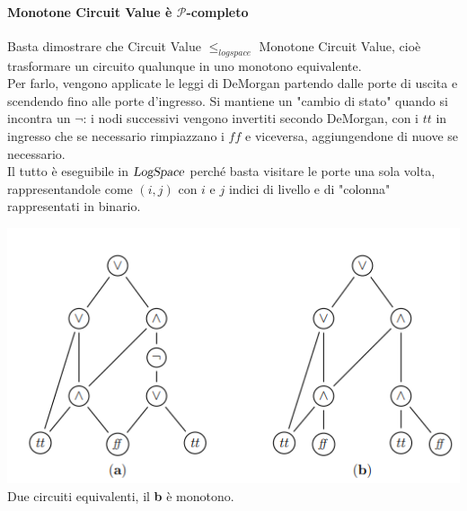 \documentclass[10pt]{book}
\begin{document}
\paragraph{Monotone Circuit Value è $\mathscr{P}$-completo} Basta dimostrare che Circuit Value $\leq_{logspace}$ Monotone Circuit Value, cioè trasformare un circuito qualunque in uno monotono equivalente.\\
Per farlo, vengono applicate le leggi di DeMorgan partendo dalle porte di uscita e scendendo fino alle porte d'ingresso. Si mantiene un "cambio di stato" quando si incontra un $\neg$: i nodi successivi vengono invertiti secondo DeMorgan, con i $tt$ in ingresso che se necessario rimpiazzano i $ff$ e viceversa, aggiungendone di nuove se necessario.\\
Il tutto è eseguibile in $\textsl{LogSpace}$ perché basta visitare le porte una sola volta, rappresentandole come $(i,j)$ con $i$ e $j$ indici di livello e di "colonna" rappresentati in binario.
\begin{center}
	\includegraphics[scale=0.75]{6.png}\\
	Due circuiti equivalenti, il \textbf{b} è monotono.
\end{center}
\end{document}
